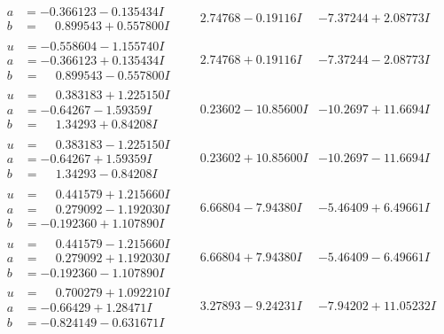 \documentclass[1p]{elsarticle_modified}
\theoremstyle{definition}
\begin{document}
$$\begin{array}{c|c|c}
\begin{aligned}
a &= -0.366123 - 0.135434 I \\
b &= \phantom{-}0.899543 + 0.557800 I\end{aligned}
 & \phantom{-}2.74768 - 0.19116 I & -7.37244 + 2.08773 I \\ \hline\begin{aligned}
u &= -0.558604 - 1.155740 I \\
a &= -0.366123 + 0.135434 I \\
b &= \phantom{-}0.899543 - 0.557800 I\end{aligned}
 & \phantom{-}2.74768 + 0.19116 I & -7.37244 - 2.08773 I \\ \hline\begin{aligned}
u &= \phantom{-}0.383183 + 1.225150 I \\
a &= -0.64267 - 1.59359 I \\
b &= \phantom{-}1.34293 + 0.84208 I\end{aligned}
 & \phantom{-}0.23602 - 10.85600 I & -10.2697 + 11.6694 I \\ \hline\begin{aligned}
u &= \phantom{-}0.383183 - 1.225150 I \\
a &= -0.64267 + 1.59359 I \\
b &= \phantom{-}1.34293 - 0.84208 I\end{aligned}
 & \phantom{-}0.23602 + 10.85600 I & -10.2697 - 11.6694 I \\ \hline\begin{aligned}
u &= \phantom{-}0.441579 + 1.215660 I \\
a &= \phantom{-}0.279092 - 1.192030 I \\
b &= -0.192360 + 1.107890 I\end{aligned}
 & \phantom{-}6.66804 - 7.94380 I & -5.46409 + 6.49661 I \\ \hline\begin{aligned}
u &= \phantom{-}0.441579 - 1.215660 I \\
a &= \phantom{-}0.279092 + 1.192030 I \\
b &= -0.192360 - 1.107890 I\end{aligned}
 & \phantom{-}6.66804 + 7.94380 I & -5.46409 - 6.49661 I \\ \hline\begin{aligned}
u &= \phantom{-}0.700279 + 1.092210 I \\
a &= -0.66429 + 1.28471 I \\
b &= -0.824149 - 0.631671 I\end{aligned}
 & \phantom{-}3.27893 - 9.24231 I & -7.94202 + 11.05232 I \\ \hline\begin{aligned}

\end{aligned}
\end{array}$$
\end{document}
